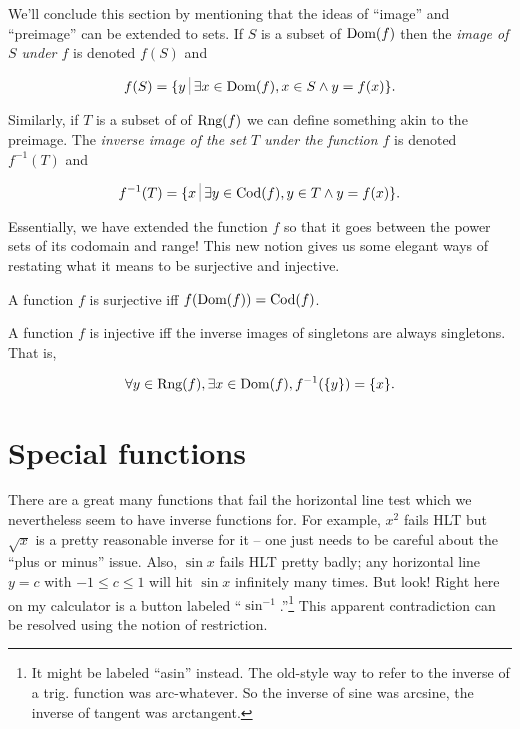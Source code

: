 We'll conclude this section by mentioning that the ideas of ``image''
and ``preimage'' can be extended to sets.  If $S$ is a subset of 
$\mbox{Dom}(f)$ then the \emph{image of $S$ under $f$}
is denoted $f(S)$ and

\[ f(S) = \{ y \suchthat \exists x \in \Dom{f}, x \in S \land y = f(x) \}. \]

Similarly, if $T$ is a subset of of $\mbox{Rng}(f)$ we can define something akin
to the preimage.  The \emph{inverse image
of the set $T$ under the function $f$} is denoted $f^{-1}(T)$ and 

\[ f^{-1}(T) = \{ x \suchthat \exists y \in \Cod{f}, y \in T \land y=f(x) \}.\]

Essentially, we have extended the function $f$ so that it goes between the
power sets of its codomain and range!  This new notion gives us some elegant
ways of restating what it means to be surjective and injective. 

A function $f$ is surjective iff $f(\mbox{Dom}(f)) = \mbox{Cod}(f)$.  

A function $f$ is injective iff the inverse images of singletons
are always singletons.  That is,

\[ \forall y \in \mbox{Rng}(f), \exists x \in \mbox{Dom}(f),  f^{-1}(\{y\}) = \{x\}. \] 

\newpage




\newpage

\section{Special functions}
\label{sec:special_functions}


There are a great many functions that fail the horizontal line test
which we nevertheless seem to have inverse functions for.  For example,
$x^2$ fails HLT but $\sqrt{x}$ is a pretty reasonable inverse for it --
one just needs to be careful about the ``plus or minus'' issue.  Also,
$\sin{x}$ fails HLT pretty badly; any horizontal line $y=c$ with 
$-1 \leq c \leq 1$ will hit $\sin{x}$ infinitely many times.  But look!
Right here on my calculator is a button labeled ``$\sin^{-1}$.''\footnote{It 
might be labeled ``asin'' instead.  The old-style way to refer to the inverse
of a trig. function was arc-whatever.  So the inverse of sine was arcsine,
the inverse of tangent was arctangent.}  This apparent contradiction
can be resolved using the notion of restriction.

